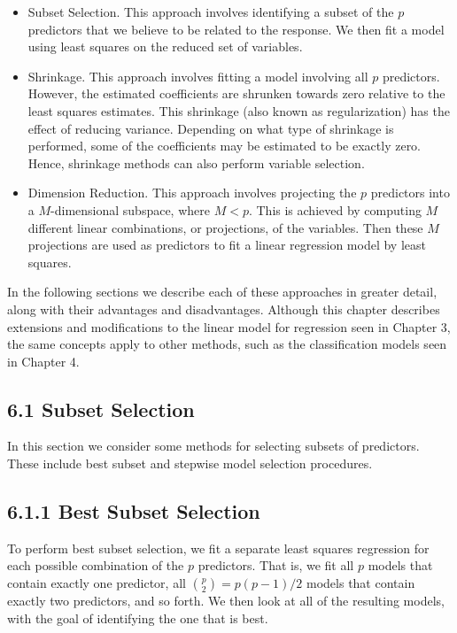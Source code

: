 \documentclass[10pt]{article}
\begin{document}
\begin{itemize}
  \item Subset Selection. This approach involves identifying a subset of the $p$ predictors that we believe to be related to the response. We then fit a model using least squares on the reduced set of variables.
  \item Shrinkage. This approach involves fitting a model involving all $p$ predictors. However, the estimated coefficients are shrunken towards zero relative to the least squares estimates. This shrinkage (also known as regularization) has the effect of reducing variance. Depending on what type of shrinkage is performed, some of the coefficients may be estimated to be exactly zero. Hence, shrinkage methods can also perform variable selection.
  \item Dimension Reduction. This approach involves projecting the $p$ predictors into a $M$-dimensional subspace, where $M<p$. This is achieved by computing $M$ different linear combinations, or projections, of the variables. Then these $M$ projections are used as predictors to fit a linear regression model by least squares.
\end{itemize}

In the following sections we describe each of these approaches in greater detail, along with their advantages and disadvantages. Although this chapter describes extensions and modifications to the linear model for regression seen in Chapter 3, the same concepts apply to other methods, such as the classification models seen in Chapter 4.

\subsection*{6.1 Subset Selection}
In this section we consider some methods for selecting subsets of predictors. These include best subset and stepwise model selection procedures.

\subsection*{6.1.1 Best Subset Selection}
To perform best subset selection, we fit a separate least squares regression for each possible combination of the $p$ predictors. That is, we fit all $p$ models that contain exactly one predictor, all $\binom{p}{2}=p(p-1) / 2$ models that contain exactly two predictors, and so forth. We then look at all of the resulting models, with the goal of identifying the one that is best.
\end{document}
